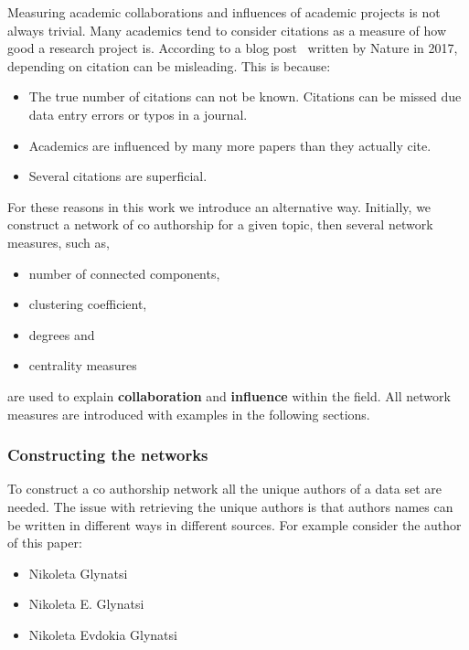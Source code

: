 \documentclass{article}
\begin{document}
Measuring academic collaborations and influences of academic projects is not
always trivial. Many
academics tend to consider citations as a measure of how good a research project
is. According to a blog post~\cite{nature_blog} written by Nature in 2017,
depending on citation can be misleading. This is because:

\begin{itemize}
    \item The true number of citations can not be known. Citations can be missed
    due data entry errors or typos in a journal.
    \item Academics are influenced by many more papers than they actually cite.
    \item Several citations are superficial.
\end{itemize}

For these reasons in this work we introduce an alternative way. 
Initially, we construct a network of co authorship for a given topic, then
several network measures, such as,

\begin{itemize}
    \item number of connected components,
    \item clustering coefficient,
    \item degrees and
    \item centrality measures
\end{itemize}

are used to explain \textbf{collaboration} and \textbf{influence} within the field. All
network measures are introduced with examples in the following sections.

\subsubsection{Constructing the networks}

To construct a co authorship network all the unique authors of a data set are needed.
The issue with retrieving the unique authors is that authors names can be written
in different ways in different sources. For example consider the author of this
paper:

\begin{itemize}
    \item Nikoleta Glynatsi
    \item Nikoleta E. Glynatsi
    \item Nikoleta Evdokia Glynatsi
\end{itemize}
\end{document}
